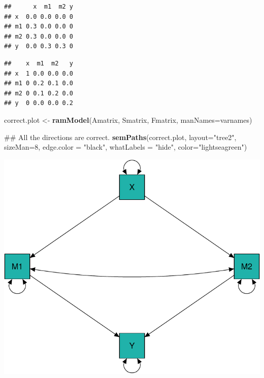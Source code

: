 \documentclass[]{article}
\newenvironment{Shaded}{\begin{snugshade}}{\end{snugshade}}
\newcommand{\KeywordTok}[1]{\textcolor[rgb]{0.13,0.29,0.53}{\textbf{#1}}}
\newcommand{\DataTypeTok}[1]{\textcolor[rgb]{0.13,0.29,0.53}{#1}}
\newcommand{\DecValTok}[1]{\textcolor[rgb]{0.00,0.00,0.81}{#1}}
\newcommand{\StringTok}[1]{\textcolor[rgb]{0.31,0.60,0.02}{#1}}
\newcommand{\OperatorTok}[1]{\textcolor[rgb]{0.81,0.36,0.00}{\textbf{#1}}}
\newcommand{\NormalTok}[1]{#1}
\begin{document}
\begin{verbatim}
##      x  m1  m2 y
## x  0.0 0.0 0.0 0
## m1 0.3 0.0 0.0 0
## m2 0.3 0.0 0.0 0
## y  0.0 0.3 0.3 0
\end{verbatim}

\begin{Shaded}
\end{Shaded}

\begin{verbatim}
##    x  m1  m2   y
## x  1 0.0 0.0 0.0
## m1 0 0.2 0.1 0.0
## m2 0 0.1 0.2 0.0
## y  0 0.0 0.0 0.2
\end{verbatim}

\begin{Shaded}
\begin{Highlighting}[]
\NormalTok{correct.plot <-}\StringTok{ }\KeywordTok{ramModel}\NormalTok{(Amatrix, Smatrix, Fmatrix, }\DataTypeTok{manNames=}\NormalTok{varnames)}

\NormalTok{## All the directions are correct.}
\KeywordTok{semPaths}\NormalTok{(correct.plot, }\DataTypeTok{layout=}\StringTok{"tree2"}\NormalTok{, }\DataTypeTok{sizeMan=}\DecValTok{8}\NormalTok{, }\DataTypeTok{edge.color =} \StringTok{"black"}\NormalTok{, }
         \DataTypeTok{whatLabels =} \StringTok{"hide"}\NormalTok{, }\DataTypeTok{color=}\StringTok{"lightseagreen"}\NormalTok{)}
\end{Highlighting}
\end{Shaded}

\includegraphics{Supplemental_materials_3_files/figure-latex/unnamed-chunk-7-1.pdf}
\end{document}
